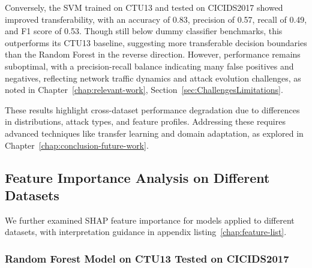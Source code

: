 Conversely, the SVM trained on CTU13 and tested on CICIDS2017 showed improved transferability, with an accuracy of 0.83, precision of 0.57, recall of 0.49, and F1 score of 0.53. Though still below dummy classifier benchmarks, this outperforms its CTU13 baseline, suggesting more transferable decision boundaries than the Random Forest in the reverse direction. However, performance remains suboptimal, with a precision-recall balance indicating many false positives and negatives, reflecting network traffic dynamics and attack evolution challenges, as noted in Chapter~\ref{chap:relevant-work}, Section~\ref{sec:ChallengesLimitations}.

These results highlight cross-dataset performance degradation due to differences in distributions, attack types, and feature profiles. Addressing these requires advanced techniques like transfer learning and domain adaptation, as explored in Chapter~\ref{chap:conclusion-future-work}.

\subsection{Feature Importance Analysis on Different Datasets}\label{subsec:feature-importance-analysis-different-datasets}

We further examined SHAP feature importance for models applied to different datasets, with interpretation guidance in appendix listing~\ref{chap:feature-list}.

\subsubsection{Random Forest Model on CTU13 Tested on CICIDS2017}\label{subsec:rf-ctu13-cicids2017}

